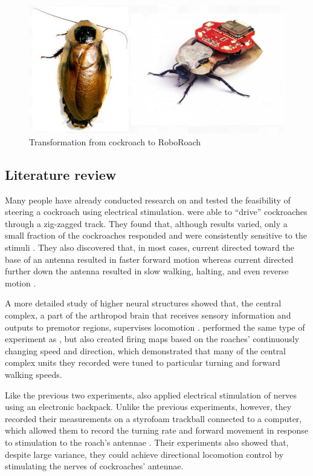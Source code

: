 \begin{figure}[ht!]
\centering
\includegraphics[scale=0.5]{Figures/motivation2.JPG}
\caption{Transformation from cockroach to RoboRoach}
\label{fig:motivation2}
\end{figure}



\subsection{Literature review}

Many people have already conducted research on and tested the feasibility of steering a cockroach using electrical stimulation. \citet{moore1998directed} were able to ``drive'' cockroaches through a zig-zagged track. They found that, although results varied, only a small fraction of the cockroaches responded and were consistently sensitive to the stimuli \citep{moore1998directed}. They also discovered that, in most cases, current directed toward the base of an antenna resulted in faster forward motion whereas current directed further down the antenna resulted in slow walking, halting, and even reverse motion \citep{moore1998directed}.

A more detailed study of higher neural structures showed that, the central complex, a part of the arthropod brain that receives sensory information and outputs to premotor regions, supervises locomotion \citep{guo2013neural}. \citet{guo2013neural} performed the same type of experiment as \citet{moore1998directed}, but also created firing maps based on the roaches' continuously changing speed and direction, which demonstrated that many of the central complex units they recorded were tuned to particular turning and forward walking speeds.

Like the previous two experiments, \citet{holzer1997locomotion} also applied electrical stimulation of nerves using an electronic backpack. Unlike the previous experiments, however, they recorded their measurements on a styrofoam trackball connected to a computer, which allowed them to record the turning rate and forward movement in response to stimulation to the roach's antennae \citep{holzer1997locomotion}. Their experiments also showed that, despite large variance, they could achieve directional locomotion control by stimulating the nerves of cockroaches' antennae.


